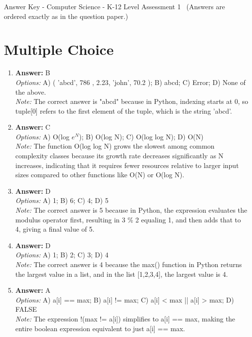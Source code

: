 \documentclass[12pt]{article}
\begin{document}
\begin{center}
Answer Key - Computer Science - K-12 Level Assessment 1 \
\small (Answers are ordered exactly as in the question paper.)
\end{center}

\section*{Multiple Choice}
\begin{enumerate}[label=\arabic*.]
\item \textbf{Answer:} B
\\ \textit{Options:} A) ( 'abcd', 786 , 2.23, 'john', 70.2 ); B) abcd; C) Error; D) None of the above.
\\ \textit{Note:} The correct answer is "abcd" because in Python, indexing starts at 0, so tuple[0] refers to the first element of the tuple, which is the string 'abcd'.
\item \textbf{Answer:} C
\\ \textit{Options:} A) O(log $e^N$); B) O(log N); C) O(log log N); D) O(N)
\\ \textit{Note:} The function O(log log N) grows the slowest among common complexity classes because its growth rate decreases significantly as N increases, indicating that it requires fewer resources relative to larger input sizes compared to other functions like O(N) or O(log N).
\item \textbf{Answer:} D
\\ \textit{Options:} A) 1; B) 6; C) 4; D) 5
\\ \textit{Note:} The correct answer is 5 because in Python, the expression evaluates the modulus operator first, resulting in 3 \% 2 equaling 1, and then adds that to 4, giving a final value of 5.
\item \textbf{Answer:} D
\\ \textit{Options:} A) 1; B) 2; C) 3; D) 4
\\ \textit{Note:} The correct answer is 4 because the max() function in Python returns the largest value in a list, and in the list [1,2,3,4], the largest value is 4.
\item \textbf{Answer:} A
\\ \textit{Options:} A) a[i] == max; B) a[i] != max; C) a[i] \textless{} max || a[i] \textgreater{} max; D) FALSE
\\ \textit{Note:} The expression !(max != a[i]) simplifies to a[i] == max, making the entire boolean expression equivalent to just a[i] == max.
\end{enumerate}
\end{document}

